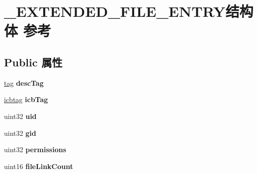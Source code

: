 \hypertarget{struct___e_x_t_e_n_d_e_d___f_i_l_e___e_n_t_r_y}{}\section{\+\_\+\+E\+X\+T\+E\+N\+D\+E\+D\+\_\+\+F\+I\+L\+E\+\_\+\+E\+N\+T\+R\+Y结构体 参考}
\label{struct___e_x_t_e_n_d_e_d___f_i_l_e___e_n_t_r_y}
\subsection*{Public 属性}
\begin{DoxyCompactItemize}
\item 
\mbox{\label{struct___e_x_t_e_n_d_e_d___f_i_l_e___e_n_t_r_y_ae717935b8b46fc35939a42c381f67a2e}} 
\hyperlink{structtag}{tag} {\bfseries desc\+Tag}
\item 
\mbox{\label{struct___e_x_t_e_n_d_e_d___f_i_l_e___e_n_t_r_y_a0495ba133b3d2279c7be45b428c5f064}} 
\hyperlink{structicbtag}{icbtag} {\bfseries icb\+Tag}
\item 
\mbox{\label{struct___e_x_t_e_n_d_e_d___f_i_l_e___e_n_t_r_y_aa14d252ffeb3a22fa60973ee29623baa}} 
uint32 {\bfseries uid}
\item 
\mbox{\label{struct___e_x_t_e_n_d_e_d___f_i_l_e___e_n_t_r_y_a364f3bdb126e5faa335dca2714c84584}} 
uint32 {\bfseries gid}
\item 
\mbox{\label{struct___e_x_t_e_n_d_e_d___f_i_l_e___e_n_t_r_y_a0c50bc764a3733e3ec00ab59a7f2f08f}} 
uint32 {\bfseries permissions}
\item 
\mbox{\label{struct___e_x_t_e_n_d_e_d___f_i_l_e___e_n_t_r_y_a362d498e2d880ca06d5f30956267ae4b}} 
uint16 {\bfseries file\+Link\+Count}
\item 
\mbox{\label{struct___e_x_t_e_n_d_e_d___f_i_l_e___e_n_t_r_y_ac1d73e904b22ec399c3e92661b0cb13e}} 

\end{DoxyCompactItemize}
